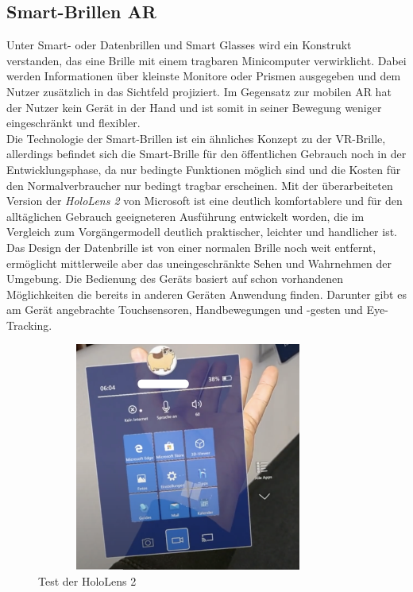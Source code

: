 \subsection*{Smart-Brillen AR}
\label{sec:smart-glasses}
Unter Smart- oder Datenbrillen und Smart Glasses wird ein Konstrukt verstanden, das eine Brille mit einem tragbaren Minicomputer verwirklicht. 
Dabei werden Informationen über kleinste Monitore oder Prismen ausgegeben und dem Nutzer zusätzlich in das Sichtfeld projiziert. Im Gegensatz
zur mobilen \acs{AR} hat der Nutzer kein Gerät in der Hand und ist somit in seiner Bewegung weniger eingeschränkt und flexibler. 
\\ 
\linebreak
Die Technologie der Smart-Brillen ist ein ähnliches Konzept zu der \acs{VR}-Brille, allerdings befindet sich die Smart-Brille für den 
öffentlichen Gebrauch noch in der Entwicklungsphase, da nur bedingte Funktionen möglich sind und die Kosten für den Normalverbraucher nur 
bedingt tragbar erscheinen. \cite{heise.2020m} Mit der überarbeiteten Version der \textit{HoloLens 2} von Microsoft ist eine deutlich komfortablere und für 
den alltäglichen Gebrauch geeigneteren Ausführung entwickelt worden, die im Vergleich zum Vorgängermodell deutlich praktischer, leichter und handlicher ist. 
Das Design der Datenbrille ist von einer normalen Brille noch weit entfernt, ermöglicht mittlerweile aber das 
uneingeschränkte Sehen und Wahrnehmen der Umgebung. Die Bedienung des Geräts basiert auf schon vorhandenen Möglichkeiten die bereits in anderen 
Geräten Anwendung finden. Darunter gibt es am Gerät angebrachte Touchsensoren, Handbewegungen und -gesten und Eye-Tracking. 
\begin{figure}[hbt!]
    \centering
    \includegraphics[width=10cm,height=7.5cm,keepaspectratio]{2Grundlagen/Bilder/smartglassAW.png}
    \caption{Test der HoloLens 2}
    \label{pic:testholo}
\end{figure}
